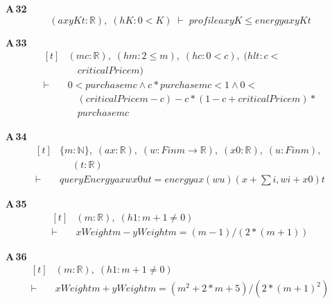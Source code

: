 \noindent\textbf{A\,32}\quad{}
{\footnotesize\[ (\mathit{a} \mathit{x} \mathit{y} \mathit{K} \mathit{t} : \mathbb{R} ),\; (\mathit{hK} : 0 < \mathit{K}) \;\vdash\; \mathit{profile} \mathit{a} \mathit{x} \mathit{y} \mathit{K} \leq \mathit{energy} \mathit{a} \mathit{x} \mathit{y} \mathit{K} \mathit{t} \]}

\noindent\textbf{A\,33}\quad{}
{\footnotesize\[ \begin{aligned}[t]
&(\mathit{m} \mathit{c} : \mathbb{R} ),\; (\mathit{hm} : 2 \leq \mathit{m}),\; (\mathit{hc} : 0 < \mathit{c}),\; (\mathit{hlt} : \mathit{c} <\\
&\quad \mathit{criticalPrice} \mathit{m})\\
\vdash\;&0 < \mathit{purchase} \mathit{m} \mathit{c} \wedge \mathit{c}*\mathit{purchase} \mathit{m} \mathit{c} < 1 \wedge 0 <\\
&\quad (\mathit{criticalPrice} \mathit{m}-\mathit{c})-\mathit{c}*(1-\mathit{c}+\mathit{criticalPrice} \mathit{m})*\\
&\quad \mathit{purchase} \mathit{m} \mathit{c}
\end{aligned} \]}

\noindent\textbf{A\,34}\quad{}
{\footnotesize\[ \begin{aligned}[t]
&\{ \mathit{m} : \mathbb{N} \},\; (\mathit{a} \mathit{x} : \mathbb{R} ),\; (\mathit{w} : \mathit{Fin} \mathit{m} \to \mathbb{R} ),\; (\mathit{x0} : \mathbb{R} ),\; (\mathit{u} : \mathit{Fin} \mathit{m}),\\
&\quad \; (\mathit{t} : \mathbb{R} )\\
\vdash\;&\mathit{queryEnergy} \mathit{a} \mathit{x} \mathit{w} \mathit{x0} \mathit{u} \mathit{t} = \mathit{energy} \mathit{a} \mathit{x} (\mathit{w} \mathit{u}) (\mathit{x} + \textstyle\sum \mathit{i}, \mathit{w} \mathit{i} + \mathit{x0}) \mathit{t}
\end{aligned} \]}

\noindent\textbf{A\,35}\quad{}
{\footnotesize\[ \begin{aligned}[t]
&(\mathit{m} : \mathbb{R} ),\; (\mathit{h1} : \mathit{m}+1 \neq 0)\\
\vdash\;&\mathit{xWeight} \mathit{m} - \mathit{yWeight} \mathit{m} = (\mathit{m}-1)/(2*(\mathit{m}+1))
\end{aligned} \]}

\noindent\textbf{A\,36}\quad{}
{\footnotesize\[ \begin{aligned}[t]
&(\mathit{m} : \mathbb{R} ),\; (\mathit{h1} : \mathit{m}+1 \neq 0)\\
\vdash\;&\mathit{xWeight} \mathit{m} + \mathit{yWeight} \mathit{m} = (\mathit{m}^{2}+2*\mathit{m}+5)/(2*(\mathit{m}+1)^{2})
\end{aligned} \]}

